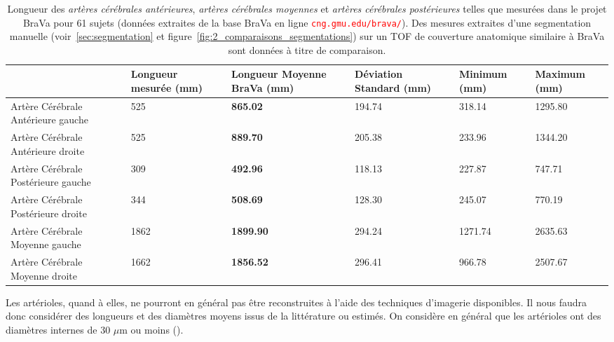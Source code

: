 \begin{table}
\caption{Longueur des {\em artères cérébrales antérieures}, {\em artères cérébrales moyennes} et {\em artères cérébrales postérieures} telles que mesurées dans le projet BraVa pour 61 sujets (données extraites de la base BraVa en ligne \textcolor{red}{\tt cng.gmu.edu/brava/}). Des mesures extraites d'une segmentation manuelle (voir~\ref{sec:segmentation} et figure~\ref{fig:2_comparaisons_segmentations}) sur un TOF de couverture anatomique similaire à BraVa sont données à titre de comparaison.}
\label{tab:databrava}
\begin{tabularx}{\linewidth}{|X| X X X X X|}
\hline
\centering
      & Longueur mesurée (mm) &  Longueur Moyenne BraVa (mm) &  Déviation Standard (mm) & Minimum (mm) & Maximum  (mm)\\
 \hline
   {\small Artère Cérébrale Antérieure gauche} & 525 &  {\bf 865.02}	&194.74	&318.14	&1295.80 \\
\hline
    {\small Artère Cérébrale Antérieure droite} & 525 & {\bf  889.70}	& 205.38	&233.96	&1344.20 \\
\hline
    {\small Artère Cérébrale Postérieure gauche} & 309 &  {\bf 492.96}	&118.13	&227.87	&747.71 \\
\hline
   {\small Artère Cérébrale Postérieure droite } & 344 & {\bf 508.69}	&128.30	&245.07	&770.19\\
\hline
   {\small Artère Cérébrale Moyenne gauche} &   1862	&{\bf  1899.90}	&294.24	&1271.74	&2635.63 \\
\hline
   {\small Artère Cérébrale Moyenne  droite} &  1662 &{\bf 1856.52}	&296.41	&966.78	&2507.67 \\
   
\hline

\end{tabularx}
\end{table}




Les artérioles, quand à elles, ne pourront en général pas être reconstruites à l'aide des techniques d'imagerie disponibles. Il nous faudra donc considérer des longueurs et des diamètres moyens issus de la littérature ou estimés. On considère en général que les artérioles ont des diamètres internes de 30 $\mu$m ou moins (\cite{Martini2009}).

